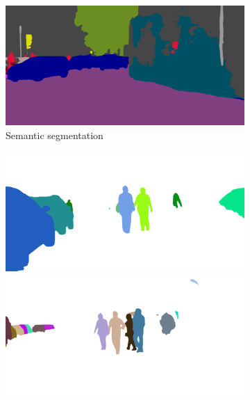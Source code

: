 {\begin{figure}[t]
{{\begin{subfigure}[t]{0.24\linewidth}
\begin{center}
		\includegraphics[width=\linewidth,trim={0px 60px 0 0px},clip]{failure/munich_000348_000019_semantic_segmentation_rgb.png}
  \caption{Semantic segmentation}
\end{center}
\end{subfigure}
\begin{subfigure}[t]{0.24\linewidth}
\begin{center}
		\includegraphics[width=\linewidth,trim={0px 60px 0 0px},clip]{failure/bielefeld_000000_021625_instance_segmentation.png}
		\includegraphics[width=\linewidth,trim={0px 60px 0 0px},clip]{failure/bielefeld_000000_025748_instance_segmentation.png}

\end{center}
\end{subfigure}}}
\end{figure}}
